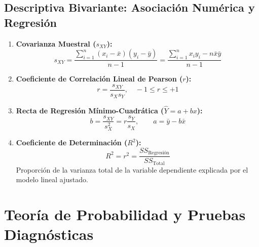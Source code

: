 \documentclass[11pt,a4paper]{report}
\theoremstyle{definition}
\begin{document}
\section{Descriptiva Bivariante: Asociación Numérica y Regresión}
\begin{enumerate}[leftmargin=*]
    \item \textbf{Covarianza Muestral ($s_{XY}$):}
    \begin{equation}
    s_{XY} = \frac{\sum_{i=1}^n (x_i - \bar{x})(y_i - \bar{y})}{n-1} = \frac{\sum_{i=1}^n x_i y_i - n\bar{x}\bar{y}}{n-1}
    \end{equation}
    \item \textbf{Coeficiente de Correlación Lineal de Pearson ($r$):}
    \begin{equation}
    r = \frac{s_{XY}}{s_X s_Y}, \quad -1 \le r \le +1
    \end{equation}
    \item \textbf{Recta de Regresión Mínimo-Cuadrática ($\hat{Y} = a + bx$):}
    \begin{equation}
    b = \frac{s_{XY}}{s_X^2} = r \frac{s_Y}{s_X}, \qquad a = \bar{y} - b\bar{x}
    \end{equation}
    \item \textbf{Coeficiente de Determinación ($R^2$):}
    \begin{equation}
    R^2 = r^2 = \frac{SS_{\text{Regresión}}}{SS_{\text{Total}}}
    \end{equation}
    Proporción de la varianza total de la variable dependiente explicada por el modelo lineal ajustado.
\end{enumerate}

\newpage
\chapter{Teoría de Probabilidad y Pruebas Diagnósticas}
\end{document}
